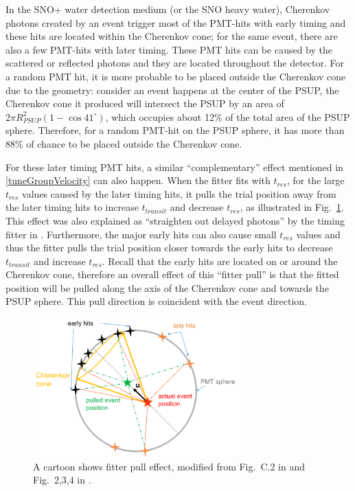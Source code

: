 In the SNO+ water detection medium (or the SNO heavy water), Cherenkov photons created by an event trigger most of the PMT-hits with early timing and these hits are located within the Cherenkov cone; for the same event, there are also a few PMT-hits with later timing. These PMT hits can be caused by the scattered or reflected photons and they are located throughout the detector. For a random PMT hit, it is more probable to be placed outside the Cherenkov cone due to the geometry: consider an event happens at the center of the PSUP, the Cherenkov cone it produced will intersect the PSUP by an area of $2\pi R^2_{PSUP}(1-\cos41^\circ)$, which occupies about 12\% of the total area of the PSUP sphere. Therefore, for a random PMT-hit on the PSUP sphere, it has more than 88\% of chance to be placed outside the Cherenkov cone. 

For these later timing PMT hits, a similar ``complementary'' effect mentioned in \ref{tuneGroupVelocity} can also happen. When the fitter fits with $t_{res}$, for the large $t_{res}$ values caused by the later timing hits, it pulls the trial position away from the later timing hits to increase $t_{transit}$ and decrease $t_{res}$, as illustrated in Fig.~\ref{fitterPull}. This effect was also explained as ``straighten out delayed photons'' by the timing fitter in \cite{driveCorPeter}. Furthermore, the major early hits can also cause small $t_{res}$ values and thus the fitter pulls the trial position closer towards the early hits to decrease $t_{transit}$ and increase $t_{res}$. Recall that the early hits are located on or around the Cherenkov cone, therefore an overall effect of this ``fitter pull'' is that the fitted position will be pulled along the axis of the Cherenkov cone and towards the PSUP sphere. This pull direction is coincident with the event direction.

\begin{figure}[!htb]
	\centering
	\includegraphics[width=8cm]{fitterPull.png}
\caption{ A cartoon shows fitter pull effect, modified from Fig.~C.2 in \cite{brice1996monte} and Fig.~2,3,4 in \cite{driveCorPeter}.}
	\label{fitterPull}
\end{figure}


